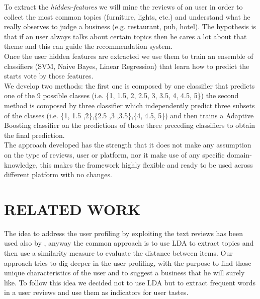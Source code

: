 \documentclass[11pt]{article}
\begin{document}
To extract the \textit{hidden-features} we will mine the reviews of an user in order to collect the most common topics (furniture, lights, etc.) and  understand what he really observes to judge a business (e.g. restaurant, pub, hotel).
The hypothesis is that if an user always talks about certain topics then he cares a lot about that theme and this can guide the recommendation system.\\
Once the user hidden features are extracted we use them to train an ensemble of classifiers (SVM, Naive Bayes, Linear Regression) that learn how to predict the starts vote by those features.\\
We develop two methods: the first one is composed by one classifier that predicts one of the 9 possible classes (i.e. \{1, 1.5, 2, 2.5, 3, 3.5, 4, 4.5, 5\}) the second method is composed by three classifier which independently predict three subsets of the classes (i.e. \{1, 1.5 ,2\},\{2.5 ,3 ,3.5\},\{4, 4.5, 5\}) and then trains a Adaptive Boosting classifier on the predictions of those three preceding classifiers to obtain the final prediction.\\
The approach developed has the strength that it does not make any assumption on the type of reviews, user or platform, nor it make use of any specific domain-knowledge, this makes the framework highly flexible and ready to be used across different platform with no changes.

\section{RELATED WORK}
The idea to address the user profiling by exploiting the text reviews has been used also by \cite{Dupuy}, anyway the common approach is to use LDA to extract topics and then use a similarity measure to evaluate the distance between items. Our approach tries to dig deeper in the user profiling, with the purpose to find those unique characteristics of the user and to suggest a business that he will surely like. To follow this idea we decided not to use LDA but to extract frequent words in a  user reviews and use them as indicators for user tastes.\\
\end{document}

